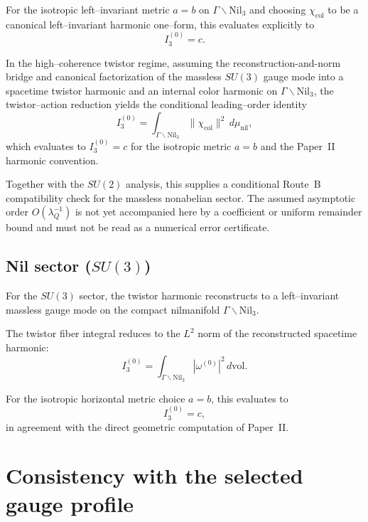\documentclass[11pt]{article}
\begin{document}
For the isotropic left--invariant metric $a=b$ on
$\Gamma\backslash\mathrm{Nil}_3$ and choosing $\chi_{\mathrm{col}}$ to be a
canonical left--invariant harmonic one--form, this evaluates explicitly to
\begin{equation}
I_3^{(0)} = c.
\label{eq:SU3_overlap_value}
\end{equation}

\begin{theorem}
In the high--coherence twistor regime, assuming the reconstruction-and-norm
bridge and canonical factorization of the
massless $SU(3)$ gauge mode into a spacetime twistor harmonic and an internal
color harmonic on $\Gamma\backslash\mathrm{Nil}_3$, the twistor--action
reduction yields the conditional leading--order identity
\[
I_3^{(0)}
=
\int_{\Gamma\backslash\mathrm{Nil}_3}
\|\chi_{\mathrm{col}}\|^2\, d\mu_{\mathrm{nil}},
\]
which evaluates to $I_3^{(0)}=c$ for the isotropic metric $a=b$ and the
Paper~II harmonic convention.
\end{theorem}

\begin{remark}
Together with the $SU(2)$ analysis, this supplies a conditional Route~B
compatibility check for the massless nonabelian sector. The assumed asymptotic
order $O(\lambda_Q^{-1})$ is not yet accompanied here by a coefficient or
uniform remainder bound and must not be read as a numerical error certificate.
\end{remark}


\subsection{Nil sector (\texorpdfstring{$SU(3)$}{SU(3)})}

For the $SU(3)$ sector, the twistor harmonic reconstructs to a left--invariant
massless gauge mode on the compact nilmanifold
$\Gamma\backslash\mathrm{Nil}_3$.

The twistor fiber integral reduces to the $L^2$ norm of the reconstructed
spacetime harmonic:
\[
I_3^{(0)} = \int_{\Gamma\backslash\mathrm{Nil}_3}
|\omega^{(0)}|^2\,d\mathrm{vol}.
\]

For the isotropic horizontal metric choice $a=b$, this evaluates to
\[
I_3^{(0)} = c,
\]
in agreement with the direct geometric computation of Paper~II.

\section{Consistency with the selected gauge profile}
\end{document}
